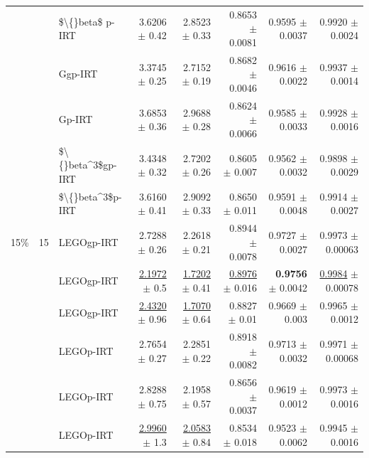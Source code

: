 \begin{longtable}{llp{}rrrrr}
 &  & \$\textbackslash\{\}beta\$ p-IRT & 3.6206 {\scriptsize $\pm$ 0.42} & 2.8523 {\scriptsize $\pm$ 0.33} & 0.8653 {\scriptsize $\pm$ 0.0081} & 0.9595 {\scriptsize $\pm$ 0.0037} & 0.9920 {\scriptsize $\pm$ 0.0024} \\
 &  & Ggp-IRT & 3.3745 {\scriptsize $\pm$ 0.25} & 2.7152 {\scriptsize $\pm$ 0.19} & 0.8682 {\scriptsize $\pm$ 0.0046} & 0.9616 {\scriptsize $\pm$ 0.0022} & 0.9937 {\scriptsize $\pm$ 0.0014} \\
 &  & Gp-IRT & 3.6853 {\scriptsize $\pm$ 0.36} & 2.9688 {\scriptsize $\pm$ 0.28} & 0.8624 {\scriptsize $\pm$ 0.0066} & 0.9585 {\scriptsize $\pm$ 0.0033} & 0.9928 {\scriptsize $\pm$ 0.0016} \\
 &  & \$\textbackslash\{\}beta\textasciicircum{}3\$gp-IRT & 3.4348 {\scriptsize $\pm$ 0.32} & 2.7202 {\scriptsize $\pm$ 0.26} & 0.8605 {\scriptsize $\pm$ 0.007} & 0.9562 {\scriptsize $\pm$ 0.0032} & 0.9898 {\scriptsize $\pm$ 0.0029} \\
 &  & \$\textbackslash\{\}beta\textasciicircum{}3\$p-IRT & 3.6160 {\scriptsize $\pm$ 0.41} & 2.9092 {\scriptsize $\pm$ 0.33} & 0.8650 {\scriptsize $\pm$ 0.011} & 0.9591 {\scriptsize $\pm$ 0.0048} & 0.9914 {\scriptsize $\pm$ 0.0027} \\
\midrule
15\% & 15 & LEGOgp-IRT & 2.7288 {\scriptsize $\pm$ 0.26} & 2.2618 {\scriptsize $\pm$ 0.21} & 0.8944 {\scriptsize $\pm$ 0.0078} & 0.9727 {\scriptsize $\pm$ 0.0027} & 0.9973 {\scriptsize $\pm$ 0.00063} \\
 &  & LEGOgp-IRT & \underline{2.1972} {\scriptsize $\pm$ 0.5} & \underline{1.7202} {\scriptsize $\pm$ 0.41} & \underline{0.8976} {\scriptsize $\pm$ 0.016} & \textbf{0.9756} {\scriptsize $\pm$ 0.0042} & \underline{0.9984} {\scriptsize $\pm$ 0.00078} \\
 &  & LEGOgp-IRT & \underline{2.4320} {\scriptsize $\pm$ 0.96} & \underline{1.7070} {\scriptsize $\pm$ 0.64} & 0.8827 {\scriptsize $\pm$ 0.01} & 0.9669 {\scriptsize $\pm$ 0.003} & 0.9965 {\scriptsize $\pm$ 0.0012} \\
 &  & LEGOp-IRT & 2.7654 {\scriptsize $\pm$ 0.27} & 2.2851 {\scriptsize $\pm$ 0.22} & 0.8918 {\scriptsize $\pm$ 0.0082} & 0.9713 {\scriptsize $\pm$ 0.0032} & 0.9971 {\scriptsize $\pm$ 0.00068} \\
 &  & LEGOp-IRT & 2.8288 {\scriptsize $\pm$ 0.75} & 2.1958 {\scriptsize $\pm$ 0.57} & 0.8656 {\scriptsize $\pm$ 0.0037} & 0.9619 {\scriptsize $\pm$ 0.0012} & 0.9973 {\scriptsize $\pm$ 0.0016} \\
 &  & LEGOp-IRT & \underline{2.9960} {\scriptsize $\pm$ 1.3} & \underline{2.0583} {\scriptsize $\pm$ 0.84} & 0.8534 {\scriptsize $\pm$ 0.018} & 0.9523 {\scriptsize $\pm$ 0.0062} & 0.9945 {\scriptsize $\pm$ 0.0016} \\

\end{longtable}
